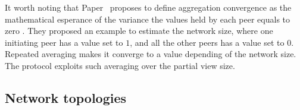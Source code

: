 It worth noting that Paper~\cite{jelasity2004epidemic} proposes to define
aggregation convergence as the mathematical esperance of the variance the
values held by each peer equals to zero . They proposed an example to estimate
the network size, where one initiating peer has a value set to $1$, and all the
other peers has a value set to $0$. Repeated averaging makes it converge to a
value depending of the network size. The \SCAMPLON{} protocol exploits such
averaging over the partial view size.

\subsection{Network topologies}

